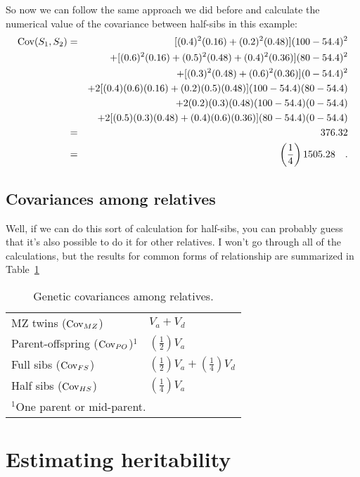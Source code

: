\documentclass[12pt]{article}
\begin{document}
So now we can follow the same approach we did before and calculate the
numerical value of the covariance between half-sibs in this example:
\begin{eqnarray*}
\mbox{Cov}(S_1,S_2) &=&\ [(0.4)^2(0.16) + (0.2)^2(0.48)](100 - 54.4)^2 \\
          && + [(0.6)^2(0.16) + (0.5)^2(0.48) + (0.4)^2(0.36)] (80 - 54.4)^2 \\
          && + [(0.3)^2(0.48) + (0.6)^2(0.36)](0 - 54.4)^2 \\
          && + 2[(0.4)(0.6)(0.16) + (0.2)(0.5)(0.48)](100 - 54.4)(80 - 54.4) \\
          && + 2(0.2)(0.3)(0.48)(100 - 54.4)(0 - 54.4) \\
          && + 2[(0.5)(0.3)(0.48) + (0.4)(0.6)(0.36)](80 - 54.4)(0 - 54.4) \\
         &=&\ 376.32 \\
         &=&\ \left({1 \over 4}\right)1505.28 \quad .
\end{eqnarray*}

\subsection*{Covariances among relatives}

Well, if we can do this sort of calculation for half-sibs, you can
probably guess that it's also possible to do it for other relatives. I
won't go through all of the calculations, but the results for common
forms of relationship are summarized in Table~\ref{table:relatives}

\begin{table}
\begin{center}
\begin{tabular}{ll}
\hline\hline
MZ twins ($\mbox{Cov}_{MZ}$) & $V_a + V_d$ \\
Parent-offspring ($\mbox{Cov}_{PO}$)$^1$ & $\left(\frac{1}{2}\right)V_a$ \\
Full sibs ($\mbox{Cov}_{FS}$) & $\left(\frac{1}{2}\right)V_a +
\left(\frac{1}{4}\right)V_d$ \\
Half sibs ($\mbox{Cov}_{HS}$) & $\left(\frac{1}{4}\right)V_a$ \\
\hline
\multicolumn{2}{l}{$^1$One parent or mid-parent.}
\end{tabular}
\end{center}
\caption{Genetic covariances among relatives.}\label{table:relatives}
\end{table}

\section*{Estimating heritability}
\end{document}
